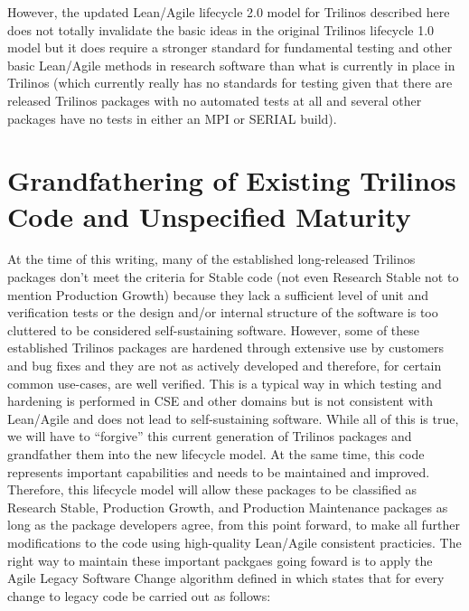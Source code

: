 \documentclass[11pt]{SANDreport}
\begin{document}
However, the updated Lean/Agile lifecycle 2.0 model for Trilinos
described here does not totally invalidate the basic ideas in the
original Trilinos lifecycle 1.0 model but it does require a stronger
standard for fundamental testing and other basic Lean/Agile methods in
research software than what is currently in place in Trilinos (which
currently really has no standards for testing given that there are
released Trilinos packages with no automated tests at all and several
other packages have no tests in either an MPI or SERIAL build).


%
{}\section{Grandfathering of Existing Trilinos Code and Unspecified
Maturity}
\label{sec:grandfathering}
%

At the time of this writing, many of the established long-released
Trilinos packages don't meet the criteria for Stable code (not even
Research Stable not to mention Production Growth) because they lack a
sufficient level of unit and verification tests or the design and/or
internal structure of the software is too cluttered to be considered
self-sustaining software.  However, some of these established Trilinos
packages are hardened through extensive use by customers and bug fixes
and they are not as actively developed and therefore, for certain
common use-cases, are well verified.  This is a typical way in which
testing and hardening is performed in CSE and other domains but is not
consistent with Lean/Agile and does not lead to self-sustaining
software.  While all of this is true, we will have to ``forgive'' this
current generation of Trilinos packages and grandfather them into the
new lifecycle model.  At the same time, this code represents important
capabilities and needs to be maintained and improved.  Therefore, this
lifecycle model will allow these packages to be classified as Research
Stable, Production Growth, and Production Maintenance packages as long
as the package developers agree, from this point forward, to make all
further modifications to the code using high-quality Lean/Agile
consistent practicies.  The right way to maintain these important
packgaes going foward is to apply the Agile Legacy Software Change
algorithm defined in {}\cite{WorkingEffectivelyWithLegacyCode05} which
states that for every change to legacy code be carried out as follows:
\end{document}
